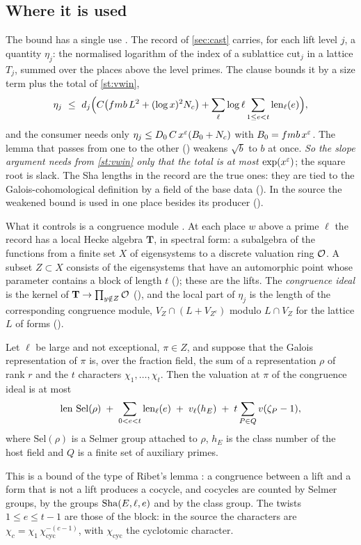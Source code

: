 \subsection{Where it is used}
The bound has a single use \lvP. The record of \cref{sec:cast} carries, for each lift
level $j$, a quantity $\eta_j$: the normalised logarithm of the index of a sublattice
$\mathrm{cut}_j$ in a lattice $T_j$, summed over the places above the level primes. The clause
 bounds it by a size term plus the total of \cref{st:vwin},
\[
\eta_j\ \le\ d_j\Bigl(C\bigl(fmb\,L^2+(\log x)^2N_c\bigr)+\sum_\ell\log\ell\sum_{1\le e<t}\operatorname{len}_\ell(e)\Bigr),
\]
and the consumer needs only $\eta_j\le D_0\,C\,x^{\varepsilon}(B_0+N_c)$ with $B_0=fmb\,x^\varepsilon$. The
lemma that passes from one to the other () weakens $\sqrt b$ to $b$ at
once. \emph{So the slope argument needs from \cref{st:vwin} only that the total is at most
$\exp(x^{\varepsilon})$}; the square root is slack. The Sha lengths in the record are the true ones:
they are tied to the Galois-cohomological definition by a field of the base data
(). In the source the weakened bound is used in one place besides its producer
().

What it controls is a congruence module \lvS. At each place $w$ above a prime $\ell$ the record
has a local Hecke algebra $\mathbf T$, in spectral form: a subalgebra of the functions from a
finite set $X$ of eigensystems to a discrete valuation ring $\mathcal{O}$. A subset $Z\subset X$
consists of the eigensystems that have an automorphic point whose parameter contains a block
of length $t$ (); these are the lifts. The \emph{congruence ideal} is the kernel of
$\mathbf T\to\prod_{y\notin Z}\mathcal{O}$ (), and the local part of $\eta_j$ is the
length of the corresponding congruence module, $V_Z\cap(L+V_{Z^c})$ modulo $L\cap V_Z$ for
the lattice $L$ of forms ().

\begin{statement}\label{st:cong}
Let $\ell$ be large and not exceptional, $\pi\in Z$, and suppose that the Galois
representation of $\pi$ is, over the fraction field, the sum of a representation $\rho$ of
rank $r$ and the $t$ characters $\chi_1,\dots,\chi_t$. Then the valuation at $\pi$ of the
congruence ideal is at most
\[
\operatorname{len}\,\mathrm{Sel}(\rho)\;+\;\sum_{0<e<t}\operatorname{len}_\ell(e)\;+\;v_\ell(h_E)\;+\;t\sum_{P\in Q}v(\zeta_P-1),
\]
where $\mathrm{Sel}(\rho)$ is a Selmer group attached to $\rho$, $h_E$ is the class number of
the host field and $Q$ is a finite set of auxiliary primes.
\end{statement}
This is a bound of the type of Ribet's lemma \cite{ribet1976}: a congruence between a lift and
a form that is not a lift produces a cocycle, and cocycles are counted by Selmer groups, by the
groups $\mathrm{Sha}(E,\ell,e)$ and by the class group. The twists $1\le e\le t-1$ are those of the
block: in the source the characters are $\chi_c=\chi_1\,\chi_{\mathrm{cyc}}^{-(c-1)}$, with
$\chi_{\mathrm{cyc}}$ the cyclotomic character.

